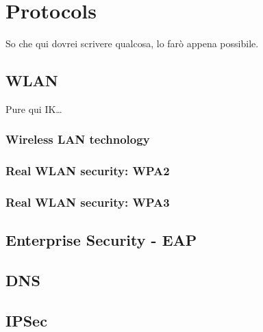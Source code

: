 \chapter{Protocols}
So che qui dovrei scrivere qualcosa, lo farò appena possibile.
\section{WLAN}
Pure qui IK\dots
\subsection{Wireless LAN technology}

\subsection{Real WLAN security: WPA2}

\subsection{Real WLAN security: WPA3}

\section{Enterprise Security - EAP}


\section{DNS}
\section{IPSec}
